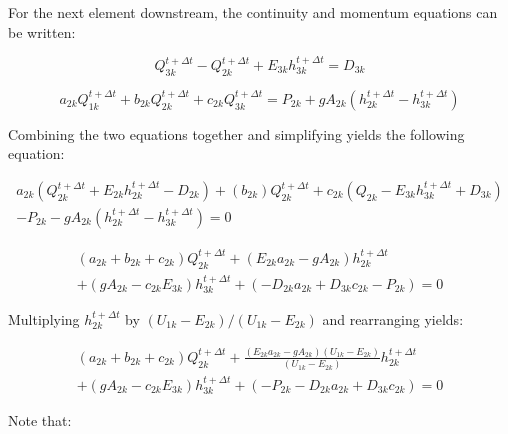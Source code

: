 \documentclass[11pt]{article}
\begin{document}
For the next element downstream, the continuity and momentum equations can be written:

\begin{equation}
  Q_{3k}^{t + \Delta t} - Q_{2k}^{t + \Delta t} + E_{3k} h_{3k}^{t + \Delta t} = D_{3k}
\end{equation}


\begin{equation}
   a_{2k} Q_{1k}^{t + \Delta t} + b_{2k} Q_{2k}^{t + \Delta t} + c_{2k} Q_{3k}^{t + \Delta t} = P_{2k} + g A_{2k} (h_{2k}^{t + \Delta t} - h_{3k}^{t + \Delta t})
\end{equation}

Combining the two equations together and simplifying yields the following equation:

\begin{equation}
  \begin{split}
    a_{2k} (Q_{2k}^{t + \Delta t} + E_{2k} h_{2k}^{t + \Delta t}
    - D_{2k}) + (b_{2k}) Q_{2k}^{t + \Delta t} + c_{2k} (Q_{2k} - E_{3k} h_{3k}^{t + \Delta t} + D_{3k}) \\ - P_{2k} - g A_{2k}
    (h_{2k}^{t + \Delta t} - h_{3k}^{t + \Delta t}) = 0
  \end{split}
\end{equation}

\begin{equation}
  \begin{split}
    (a_{2k} + b_{2k} + c_{2k})  Q_{2k}^{t + \Delta t} + ( E_{2k} a_{2k} - g A_{2k}) h_{2k}^{t + \Delta t} \\ + (g A_{2k} - c_{2k} E_{3k}) h_{3k}^{t + \Delta t}   
    + (- D_{2k} a_{2k}   + D_{3k} c_{2k} - P_{2k}) = 0 
  \end{split}
\end{equation}

Multiplying $h_{2k}^{t + \Delta t}$ by $(U_{1k} - E_{2k}) / (U_{1k} - E_{2k})$
and rearranging yields:

\begin{equation}
  \begin{split}
    (a_{2k} + b_{2k} + c_{2k})  Q_{2k}^{t + \Delta t} + \frac{( E_{2k} a_{2k} - g A_{2k})(U_{1k} - E_{2k})}{(U_{1k} - E_{2k})} h_{2k}^{t + \Delta t} \\ + (g A_{2k} - c_{2k} E_{3k}) h_{3k}^{t + \Delta t}   
    + (- P_{2k} - D_{2k} a_{2k}   + D_{3k} c_{2k} ) = 0 
  \end{split}
\end{equation}

Note that:
\end{document}
